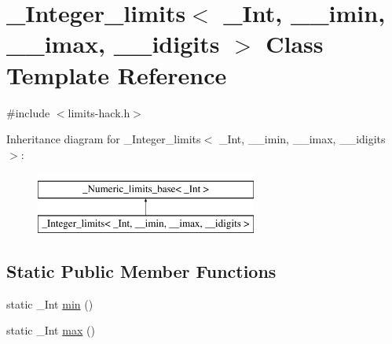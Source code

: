 \hypertarget{class__Integer__limits}{}\section{\+\_\+\+Integer\+\_\+limits$<$ \+\_\+\+Int, \+\_\+\+\_\+imin, \+\_\+\+\_\+imax, \+\_\+\+\_\+idigits $>$ Class Template Reference}
\label{class__Integer__limits}


{\ttfamily \#include $<$limits-\/hack.\+h$>$}

Inheritance diagram for \+\_\+\+Integer\+\_\+limits$<$ \+\_\+\+Int, \+\_\+\+\_\+imin, \+\_\+\+\_\+imax, \+\_\+\+\_\+idigits $>$\+:\begin{figure}[H]
\begin{center}
\leavevmode
\includegraphics[height=2.000000cm]{class__Integer__limits}
\end{center}
\end{figure}
\subsection*{Static Public Member Functions}
\begin{DoxyCompactItemize}
\item 
static \+\_\+\+Int \hyperlink{class__Integer__limits_a1540ba569220ba61c79d80d2b60f97a7}{min} ()
\item 
static \+\_\+\+Int \hyperlink{class__Integer__limits_a6e40e848c73a41ef3ebce628801fc340}{max} ()
\end{DoxyCompactItemize}
